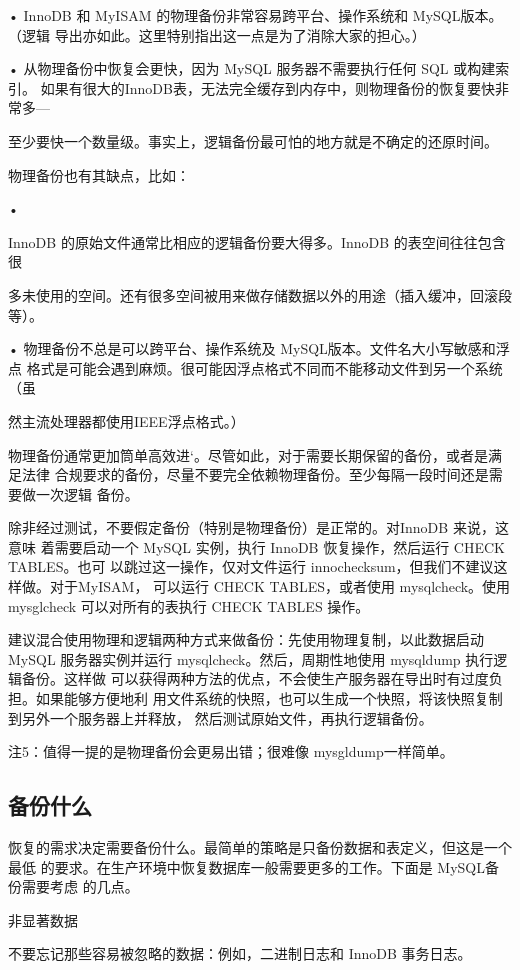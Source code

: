 • InnoDB 和 MyISAM 的物理备份非常容易跨平台、操作系统和 MySQL版本。（逻辑
导出亦如此。这里特别指出这一点是为了消除大家的担心。）

• 从物理备份中恢复会更快，因为 MySQL 服务器不需要执行任何 SQL 或构建索引。
如果有很大的InnoDB表，无法完全缓存到内存中，则物理备份的恢复要快非常多—

至少要快一个数量级。事实上，逻辑备份最可怕的地方就是不确定的还原时间。

物理备份也有其缺点，比如：

•

InnoDB 的原始文件通常比相应的逻辑备份要大得多。InnoDB 的表空间往往包含很

多未使用的空间。还有很多空间被用来做存储数据以外的用途（插入缓冲，回滚段等）。

• 物理备份不总是可以跨平台、操作系统及 MySQL版本。文件名大小写敏感和浮点
格式是可能会遇到麻烦。很可能因浮点格式不同而不能移动文件到另一个系统（虽

然主流处理器都使用IEEE浮点格式。）

物理备份通常更加筒单高效进‘。尽管如此，对于需要长期保留的备份，或者是满足法律
合规要求的备份，尽量不要完全依赖物理备份。至少每隔一段时间还是需要做一次逻辑
备份。

除非经过测试，不要假定备份（特别是物理备份）是正常的。对InnoDB 来说，这意味
着需要启动一个 MySQL 实例，执行 InnoDB 恢复操作，然后运行 CHECK TABLES。也可
以跳过这一操作，仅对文件运行 innochecksum，但我们不建议这样做。对于MyISAM，
可以运行 CHECK TABLES，或者使用 mysqlcheck。使用mysglcheck 可以对所有的表执行
CHECK TABLES 操作。

建议混合使用物理和逻辑两种方式来做备份：先使用物理复制，以此数据启动MySQL
服务器实例并运行 mysqlcheck。然后，周期性地使用 mysqldump 执行逻辑备份。这样做
可以获得两种方法的优点，不会使生产服务器在导出时有过度负担。如果能够方便地利
用文件系统的快照，也可以生成一个快照，将该快照复制到另外一个服务器上并释放，
然后测试原始文件，再执行逻辑备份。

注5：值得一提的是物理备份会更易出错；很难像 mysgldump一样简单。

\subsection{备份什么}
恢复的需求决定需要备份什么。最简单的策略是只备份数据和表定义，但这是一个最低
的要求。在生产环境中恢复数据库一般需要更多的工作。下面是 MySQL备份需要考虑
的几点。

非显著数据

不要忘记那些容易被忽略的数据：例如，二进制日志和 InnoDB 事务日志。

